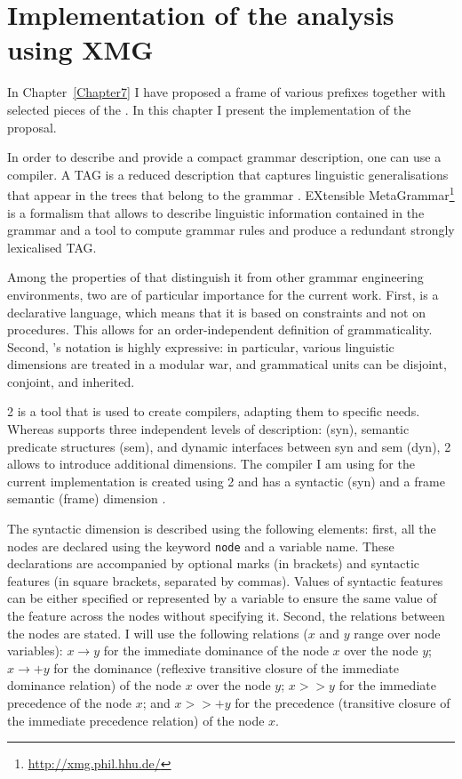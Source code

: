 
\chapter{Implementation of the analysis using XMG} %
\label{Chapter8}
In Chapter~\ref{Chapter7} I have proposed a frame  of various prefixes together with selected pieces of the . In this chapter I present the implementation of the proposal.

 In order to describe and provide a compact grammar description, one can use a  compiler. A TAG  is a reduced description that captures linguistic generalisations that appear in the trees that belong to the grammar \citep{Candito:99}. EXtensible MetaGrammar\footnote{\url{http://xmg.phil.hhu.de/}} \citep[,][]{Crabbe:13} is a formalism that allows to describe linguistic information contained in the grammar and a tool to compute grammar rules and produce a redundant strongly lexicalised TAG. 
 
Among the properties of  that distinguish it from other grammar engineering environments, two are of particular importance for the current work. First,  is a declarative language, which means that it is based on constraints and not on procedures. This allows for an order-independent definition of grammaticality. Second, 's notation is highly expressive: in particular, various linguistic dimensions are treated in a modular war, and grammatical units can be disjoint, conjoint, and inherited.
 
  2 \citep{Petitjean:16} is a tool that is used to create  compilers, adapting them to specific needs. Whereas  supports three independent levels of description:  (syn), semantic predicate structures (sem), and dynamic interfaces between syn and sem (dyn),  2 allows to introduce additional dimensions. The compiler I am using for the current implementation is created using  2 and has a syntactic (syn) and a frame semantic (frame) dimension  \citep{Lichte:15}.

The syntactic dimension is described using the following elements: first, all the nodes are declared using the keyword \texttt{node} and a variable name. These declarations are accompanied by optional marks (in brackets) and syntactic features (in square brackets, separated by commas). Values of syntactic features can be either specified or represented by a variable to ensure the same value of the feature across the nodes without specifying it. Second, the relations between the nodes are stated. I will use the following relations ($x$ and $y$ range over node variables): $x \rightarrow y$ for the immediate dominance of the node $x$ over the node $y$; $x \rightarrow + y$ for the dominance (reflexive transitive closure of the immediate dominance relation) of the node $x$ over the node $y$; 
$x >> y$ for the immediate precedence of the node $x$; and $x >>+ y$ for the precedence (transitive closure of the immediate precedence relation) of the node $x$.

